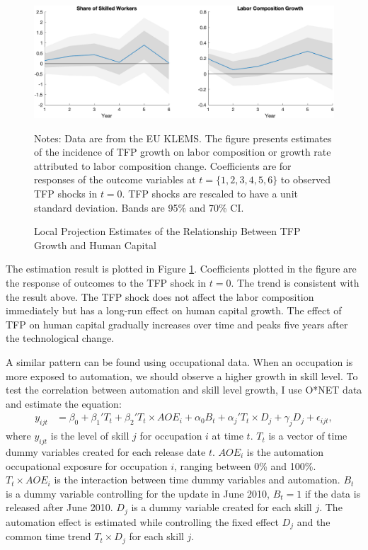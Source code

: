 \documentclass[12pt]{article}
\begin{document}
\begin{figure}[h!]
\includegraphics[width = \textwidth]{LP}
\caption{Local Projection Estimates of the Relationship Between TFP Growth and Human Capital}
\label{LP}
{\scriptsize Notes: Data are from the EU KLEMS. The figure presents estimates of the incidence of TFP growth on labor composition or growth rate attributed to labor composition change. Coefficients are for responses of the outcome variables at $t = \{1,2,3,4,5,6\}$ to observed TFP shocks in $t = 0$. TFP shocks are rescaled to have a unit standard deviation. Bands are 95\% and 70\% CI.}
\end{figure}

The estimation result is plotted in Figure \ref{LP}. Coefficients plotted in the figure are the response of outcomes to the TFP shock in $t = 0$. The trend is consistent with the result above. The TFP shock does not affect the labor composition immediately but has a long-run effect on human capital growth. The effect of TFP on human capital gradually increases over time and peaks five years after the technological change. 

A similar pattern can be found using occupational data. When an occupation is more exposed to automation, we should observe a higher growth in skill level. To test the correlation between automation and skill level growth, I use O*NET data and estimate the equation:
\begin{align}
y_{ijt} &= \beta_0 + \beta_1' T_t +\beta_2' T_t \times AOE_{i}+\alpha_0 B_t+\alpha_j' T_t \times D_j +\gamma_j D_j+ \epsilon_{ijt},
\end{align}
where $y_{ijt}$ is the level of skill $j$ for occupation $i$ at time $t$. $T_t$ is a vector of time dummy variables created for each release date $t$. $AOE_{i}$ is the automation occupational exposure for occupation $i$, ranging between 0\% and 100\%. $T_t \times AOE_{i}$ is the interaction between time dummy variables and automation. $B_t$ is a dummy variable controlling for the update in June 2010, $B_t = 1$ if the data is released after June 2010. $D_j$ is a dummy variable created for each skill $j$. The automation effect is estimated while controlling the fixed effect $D_j$ and the common time trend $T_t \times D_j$ for each skill $j$. 
\end{document}
